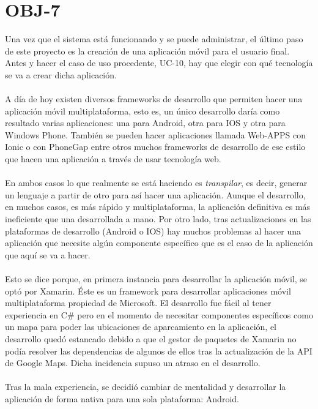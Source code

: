 \section{OBJ-7}
Una vez que el sistema está funcionando y se puede administrar, el último paso de este proyecto es la creación de una aplicación móvil para el usuario final. Antes y hacer el caso de uso procedente, UC-10, hay que elegir con qué tecnología se va a crear dicha aplicación.
\\\\
A día de hoy existen diversos frameworks de desarrollo que permiten hacer una aplicación móvil multiplataforma, esto es, un único desarrollo daría como resultado varias aplicaciones: una para Android, otra para IOS y otra para Windows Phone. También se pueden hacer aplicaciones llamada Web-APPS con Ionic \cite{ionic} o con PhoneGap \cite{phonegap} entre otros muchos frameworks de desarrollo de ese estilo que hacen una aplicación a través de usar tecnología web.
\\\\
En ambos casos lo que realmente se está haciendo es \textit{transpilar}, es decir, generar un lenguaje a partir de otro para así hacer una aplicación. Aunque el desarrollo, en muchos casos, es más rápido y multiplataforma, la aplicación definitiva es más ineficiente que una desarrollada a mano. Por otro lado, tras actualizaciones en las plataformas de desarrollo (Android o IOS) hay muchos problemas al hacer una aplicación que necesite algún componente específico que es el caso de la aplicación que aquí se va a hacer. 
\\\\
Esto se dice porque, en primera instancia para desarrollar la aplicación móvil, se optó por Xamarin. Éste es un framework para desarrollar aplicaciones móvil multiplataforma propiedad de Microsoft. El desarrollo fue fácil al tener experiencia en C\# pero en el momento de necesitar componentes específicos como un mapa para poder las ubicaciones de aparcamiento en la aplicación, el desarrollo quedó estancado debido a que el gestor de paquetes de Xamarin no podía resolver las dependencias de algunos de ellos tras la actualización de la API de Google Maps. Dicha incidencia supuso un atraso en el desarrollo.
\\\\
Tras la mala experiencia, se decidió cambiar de mentalidad y desarrollar la aplicación de forma nativa para una sola plataforma: Android.
\\\\
